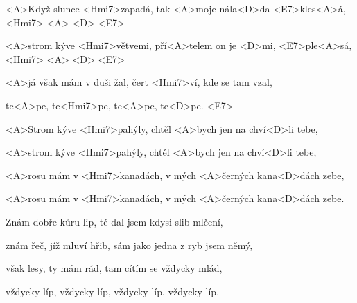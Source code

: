 

\zs
<A>Když slunce <Hmi7>zapadá, tak <A>moje nála<D>da <E7>kles<A>á, <Hmi7> <A> <D> <E7>

<A>strom kýve <Hmi7>větvemi, pří<A>telem on je <D>mi, <E7>ple<A>sá, <Hmi7> <A> <D> <E7>

<A>já však mám v duši žal, čert <Hmi7>ví, kde se tam vzal,

te<A>pe, te<Hmi7>pe, te<A>pe, te<D>pe. <E7>
\ks

\zr
<A>Strom kýve <Hmi7>pahýly, chtěl <A>bych jen na chví<D>li tebe,

<A>strom kýve <Hmi7>pahýly, chtěl <A>bych jen na chví<D>li tebe,

<A>rosu mám v <Hmi7>kanadách, v mých <A>černých kana<D>dách zebe,

<A>rosu mám v <Hmi7>kanadách, v mých <A>černých kana<D>dách zebe.
\kr

\zs
Znám dobře kůru lip, té dal jsem kdysi slib mlčení,

znám řeč, jíž mluví hřib, sám jako jedna z ryb jsem němý,

však lesy, ty mám rád, tam cítím se vždycky mlád,

vždycky líp, vždycky líp, vždycky líp, vždycky líp.
\ks

\zr
\kr

\kp



